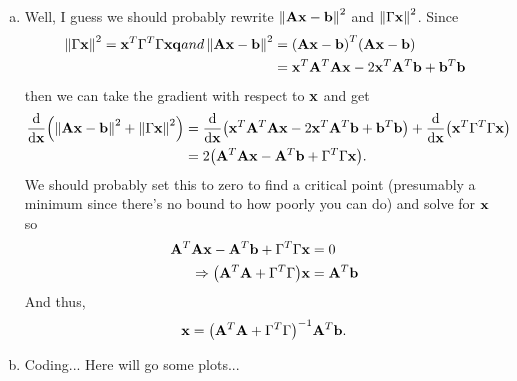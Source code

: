 \documentclass[12pt,letterpaper]{hmcpset}
\begin{document}
\begin{solution}
\begin{enumerate}[(a)]
		\item Well, I guess we should probably rewrite $\left\lVert\vb A \vb x - \vb b\right\rVert^2$ and $\left\lVert\Gamma \vb x\right\rVert^2$. Since
		\begin{align*}
			\left\lVert\Gamma \vb x\right\rVert^2 = \vb x^T \Gamma^T \Gamma \vb x {\bf q}{and} \left\lVert\vb A \vb x - \vb b\right\rVert^2 &= \qty(\vb A \vb x - \vb b)^T \qty(\vb A \vb x - \vb b) \\
			&= \vb x^T \vb A^T \vb A \vb x - 2 \vb x^T \vb A^T \vb b + \vb b^T \vb b 
		\end{align*}
		then we can take the gradient with respect to $\vb x$ and get
		\begin{align*}
			\dv{\vb x}\qty(\left\lVert\vb A \vb x - \vb b\right\rVert^2 + \left\lVert\Gamma \vb x\right\rVert^2 ) &= \dv{\vb x}\qty(\vb x^T \vb A^T \vb A \vb x - 2 \vb x^T \vb A^T \vb b + \vb b^T \vb b ) + \dv{\vb x}\qty(\vb x^T \Gamma^T \Gamma \vb x )\\
			&= 2 \qty(\vb A^T \vb A \vb x - \vb A^T \vb b + \Gamma^T \Gamma \vb x).
		\end{align*}
		We should probably set this to zero to find a critical point (presumably a minimum since there's no bound to how poorly you can do) and solve for $\vb x$ so
		\begin{align*}
		\vb A^T \vb A \vb x - \vb A^T \vb b + \Gamma^T \Gamma \vb x &= 0 \\
		\Rightarrow 
		\qty(\vb A^T \vb A  + \Gamma^T \Gamma )\vb x &=  \vb A^T \vb b 
		\end{align*}
		And thus, 
		\begin{align*}
			\vb x = \qty(\vb A^T \vb A  + \Gamma^T \Gamma )^{-1}\vb A^T \vb b .
		\end{align*}

		\item Coding... Here will go some plots...


\end{enumerate}
\end{solution}
\end{document}
